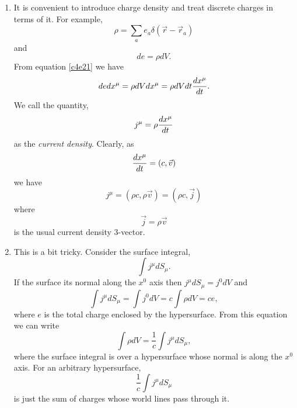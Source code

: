 \begin{enumerate}
\item It is convenient to introduce charge density and treat discrete charges in
terms of it. For example,
\begin{equation}\label{c4e20}
\rho = \sum_a e_a\delta(\vec{r} - \vec{r}_a)
\end{equation}
and
\begin{equation}\label{c4e21}
de = \rho dV.
\end{equation}
From equation \eqref{c4e21} we have
\begin{equation}\label{c4e22}
de dx^\mu = \rho dV dx^\mu = \rho dV dt \frac{d{x^\mu}}{d{t}}.
\end{equation}
We call the quantity,
\begin{equation}\label{c4e23}
j^\mu = \rho\frac{d{x^\mu}}{d{t}}
\end{equation}
as the \emph{current density}. Clearly, as 
\[
\frac{d{x^\mu}}{d{t}} = (c, \vec{v})
\]
we have
\begin{equation}\label{c4e24}
j^\mu = (\rho c, \rho\vec{v}) = (\rho c, \vec{j})
\end{equation}
where
\begin{equation}\label{c4e25}
\vec{j} = \rho\vec{v}
\end{equation}
is the usual current density 3-vector.

\item This is a bit tricky. Consider the surface integral,
\[
\int j^\mu dS_\mu.
\]
If the surface its normal along the $x^0$ axis then $j^\mu dS_\mu = j^0 dV$ and
\[
\int j^\mu dS_\mu = \int j^0 dV = c\int \rho dV = ce,
\]
where $e$ is the total charge enclosed by the hypersurface. From this equation
we can write
\begin{equation}\label{c4e26}
\int\rho dV = \frac{1}{c}\int j^\mu dS_\mu,
\end{equation}
where the surface integral is over a hypersurface whose normal is along the 
$x^0$ axis. For an arbitrary hypersurface,
\[
\frac{1}{c}\int j^\mu dS_\mu
\]
is just the sum of charges whose world lines pass through it.


\end{enumerate}
